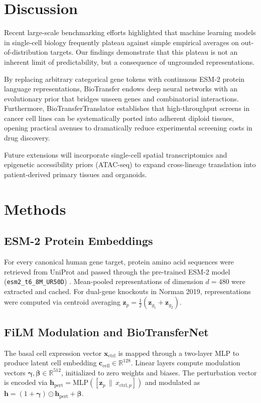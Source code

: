 \documentclass[11pt,letterpaper]{article}
\begin{document}
\section{Discussion}
Recent large-scale benchmarking efforts \cite{ahlmann2025benchmarking} highlighted that machine learning models in single-cell biology frequently plateau against simple empirical averages on out-of-distribution targets. Our findings demonstrate that this plateau is not an inherent limit of predictability, but a consequence of ungrounded representations.

By replacing arbitrary categorical gene tokens with continuous ESM-2 protein language representations, BioTransfer endows deep neural networks with an evolutionary prior that bridges unseen genes and combinatorial interactions. Furthermore, BioTransferTranslator establishes that high-throughput screens in cancer cell lines can be systematically ported into adherent diploid tissues, opening practical avenues to dramatically reduce experimental screening costs in drug discovery.

Future extensions will incorporate single-cell spatial transcriptomics and epigenetic accessibility priors (ATAC-seq) to expand cross-lineage translation into patient-derived primary tissues and organoids.

\section{Methods}

\subsection{ESM-2 Protein Embeddings}
For every canonical human gene target, protein amino acid sequences were retrieved from UniProt and passed through the pre-trained ESM-2 model (\texttt{esm2\_t6\_8M\_UR50D}) \cite{lin2023evolutionary}. Mean-pooled representations of dimension $d = 480$ were extracted and cached. For dual-gene knockouts in Norman 2019, representations were computed via centroid averaging $\mathbf{z}_{p} = \frac{1}{2}(\mathbf{z}_{g_1} + \mathbf{z}_{g_2})$.

\subsection{FiLM Modulation and BioTransferNet}
The basal cell expression vector $\mathbf{x}_{\text{ctrl}}$ is mapped through a two-layer MLP to produce latent cell embedding $\mathbf{c}_{\text{cell}} \in \mathbb{R}^{128}$. Linear layers compute modulation vectors $\boldsymbol{\gamma}, \boldsymbol{\beta} \in \mathbb{R}^{512}$, initialized to zero weights and biases. The perturbation vector is encoded via $\mathbf{h}_{\text{pert}} = \text{MLP}([\mathbf{z}_p \,\|\, x_{\text{ctrl}, p}])$ and modulated as $\mathbf{h} = (1 + \boldsymbol{\gamma}) \odot \mathbf{h}_{\text{pert}} + \boldsymbol{\beta}$.
\end{document}
